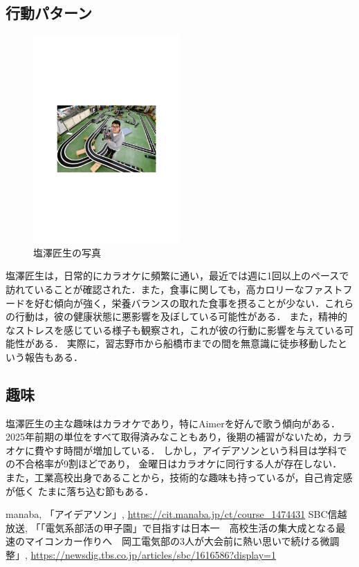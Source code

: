 \documentclass[uplatex,dvipdfmx]{jsarticle}
\begin{document}
\subsection{行動パターン}
\begin{figure}[H]
    \centering
    \includegraphics[width=0.5\textwidth]{shiotaku_1.pdf}
    \caption{塩澤匠生の写真}
    \label{fig:shiotaku}
\end{figure}
塩澤匠生は，日常的にカラオケに頻繁に通い，最近では週に1回以上のペースで訪れていることが確認された．また，食事に関しても，高カロリーなファストフードを好む傾向が強く，栄養バランスの取れた食事を摂ることが少ない．これらの行動は，彼の健康状態に悪影響を及ぼしている可能性がある．
また，精神的なストレスを感じている様子も観察され，これが彼の行動に影響を与えている可能性がある．
実際に，習志野市から船橋市までの間を無意識に徒歩移動したという報告もある．
\subsection{趣味}
塩澤匠生の主な趣味はカラオケであり，特にAimerを好んで歌う傾向がある．
2025年前期の単位をすべて取得済みなこともあり，後期の補習がないため，カラオケに費やす時間が増加している．
しかし，アイデアソンという科目は学科での不合格率が9割ほどであり，
金曜日はカラオケに同行する人が存在しない\cite{ref:ideathon}．
また，工業高校出身であることから，技術的な趣味も持っているが，自己肯定感が低く
たまに落ち込む節もある\cite{ref:kougyou}．

\begin{thebibliography}{9}
 manaba, 「アイデアソン」, \url{https://cit.manaba.jp/ct/course_1474431}
 SBC信越放送, 「「電気系部活の甲子園」で目指すは日本一　高校生活の集大成となる最速のマイコンカー作りへ　岡工電気部の3人が大会前に熱い思いで続ける微調整」, \url{https://newsdig.tbs.co.jp/articles/sbc/1616586?display=1}
\end{thebibliography}
\end{document}
